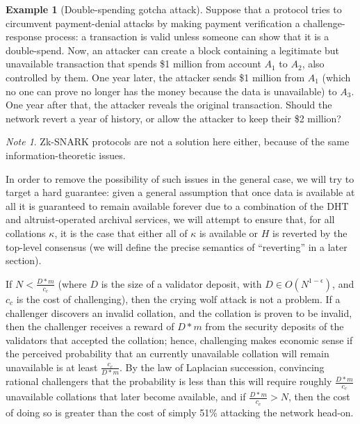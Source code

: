 \documentclass[11pt,a4paper]{article}
\theoremstyle{plain}
\theoremstyle{definition}
\newtheorem{exmp}{Example}[section]
\theoremstyle{remark}
\newtheorem*{note}{Note}
\begin{document}
\begin{exmp}[Double-spending gotcha attack]
Suppose that a protocol tries to circumvent payment-denial attacks by making payment verification a challenge-response process: a transaction is valid unless someone can show that it is a double-spend. Now, an attacker can create a block containing a legitimate but unavailable transaction that spends \$1 million from account $A_1$ to $A_2$, also controlled by them. One year later, the attacker sends \$1 million from $A_1$ (which no one can prove no longer has the money because the data is unavailable) to $A_3$. One year after that, the attacker reveals the original transaction. Should the network revert a year of history, or allow the attacker to keep their \$2 million?
\end{exmp}

\begin{note}
Zk-SNARK protocols are not a solution here either, because of the same information-theoretic issues.
\end{note}

In order to remove the possibility of such issues in the general case, we will try to target a hard guarantee: given a general assumption that once data is available at all it is guaranteed to remain available forever due to a combination of the DHT and altruist-operated archival services, we will attempt to ensure that, for all collations $\kappa$, it is the case that either all of $\kappa$ is available or $H$ is reverted by the top-level consensus (we will define the precise semantics of ``reverting'' in a later section).

If $N < \frac{D * m}{c_c}$ (where $D$ is the size of a validator deposit, with $D \in O(N^{1-\epsilon})$, and $c_c$ is the cost of challenging), then the crying wolf attack is not a problem. If a challenger discovers an invalid collation, and the collation is proven to be invalid, then the challenger receives a reward of $D * m$ from the security deposits of the validators that accepted the collation; hence, challenging makes economic sense if the perceived probability that an currently unavailable collation will remain unavailable is at least $\frac{c_c}{D * m}$. By the law of Laplacian succession\cite{laplace}, convincing rational challengers that the probability is less than this will require roughly $\frac{D * m}{c_c}$ unavailable collations that later become available, and if $\frac{D * m}{c_c} > N$, then the cost of doing so is greater than the cost of simply 51\% attacking the network head-on.
\end{document}
